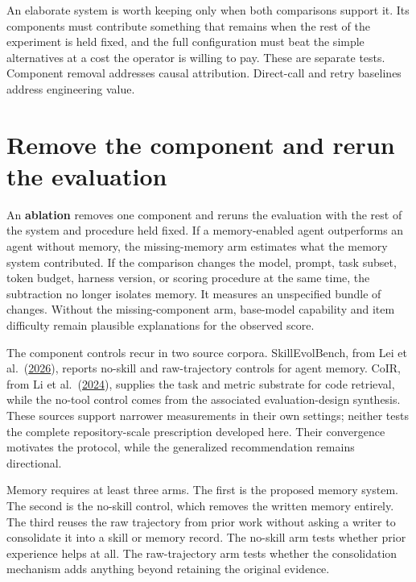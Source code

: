An elaborate system is worth keeping only when both comparisons support it. Its components must contribute something that remains when the rest of the experiment is held fixed, and the full configuration must beat the simple alternatives at a cost the operator is willing to pay. These are separate tests. Component removal addresses causal attribution. Direct-call and retry baselines address engineering value.

\hypertarget{remove-the-component-and-rerun-the-evaluation}{%
\section{Remove the component and rerun the evaluation}\label{remove-the-component-and-rerun-the-evaluation}}

An \textbf{ablation} removes one component and reruns the evaluation with the rest of the system and procedure held fixed. If a memory-enabled agent outperforms an agent without memory, the missing-memory arm estimates what the memory system contributed. If the comparison changes the model, prompt, task subset, token budget, harness version, or scoring procedure at the same time, the subtraction no longer isolates memory. It measures an unspecified bundle of changes. Without the missing-component arm, base-model capability and item difficulty remain plausible explanations for the observed score.

The component controls recur in two source corpora. SkillEvolBench, from Lei et al.~(\href{https://arxiv.org/abs/2605.24117}{2026}), reports no-skill and raw-trajectory controls for agent memory. CoIR, from Li et al.~(\href{https://arxiv.org/abs/2407.02883}{2024}), supplies the task and metric substrate for code retrieval, while the no-tool control comes from the associated evaluation-design synthesis. These sources support narrower measurements in their own settings; neither tests the complete repository-scale prescription developed here. Their convergence motivates the protocol, while the generalized recommendation remains directional.

Memory requires at least three arms. The first is the proposed memory system. The second is the no-skill control, which removes the written memory entirely. The third reuses the raw trajectory from prior work without asking a writer to consolidate it into a skill or memory record. The no-skill arm tests whether prior experience helps at all. The raw-trajectory arm tests whether the consolidation mechanism adds anything beyond retaining the original evidence.

